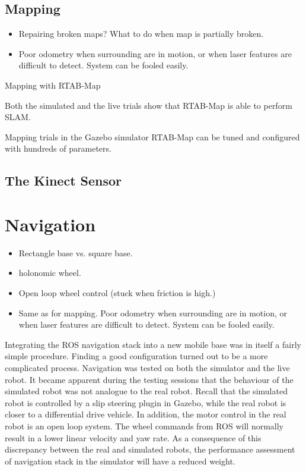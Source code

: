 \subsection{Mapping}

\begin{itemize}
\item Repairing broken maps? What to do when map is partially broken.
\item Poor odometry when surrounding are in motion, or when laser features are difficult to detect. System can be fooled easily. 
\end{itemize}

Mapping with \ac{RTAB-Map} 

Both the simulated and the live trials show that \ac{RTAB-Map} is able to perform \ac{SLAM}. 

Mapping trials in the Gazebo simulator
\ac{RTAB-Map} can be tuned and configured with hundreds of parameters.

\subsection{The Kinect Sensor}



\section{Navigation}
\begin{itemize}
\item Rectangle base vs. square base.
\item holonomic wheel.
\item Open loop wheel control (stuck when friction is high.)
\item Same as for mapping. Poor odometry when surrounding are in motion, or when laser features are difficult to detect. System can be fooled easily. 
\end{itemize}

Integrating the \ac{ROS} navigation stack into a new mobile base was in itself a fairly simple procedure. Finding a good configuration turned out to be a more complicated process. Navigation was tested on both the simulator and the live robot. It became apparent during the testing sessions that the behaviour of the simulated robot was not analogue to the real robot. Recall that the simulated robot is controlled by a slip steering plugin in Gazebo, while the real robot is closer to a differential drive vehicle. In addition, the motor control in the real robot is an open loop system. The wheel commands from \ac{ROS} will normally result in a lower linear velocity and yaw rate. As a consequence of this discrepancy between the real and simulated robots, the performance assessment of navigation stack in the simulator will have a reduced weight.

